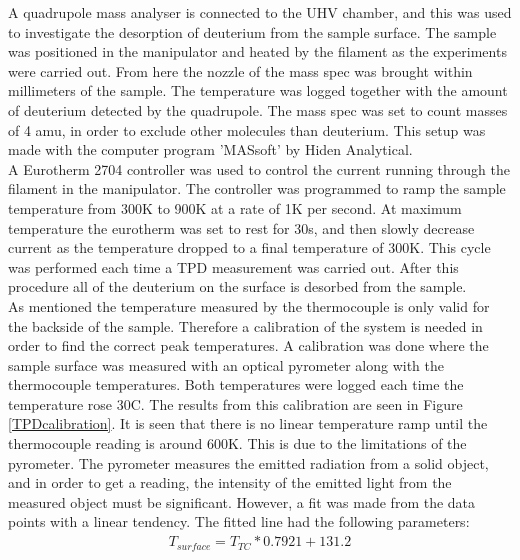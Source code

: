 A quadrupole mass analyser is connected to the UHV chamber, and this was used to investigate the desorption of deuterium from the sample surface. The sample was positioned in the manipulator and heated by the filament as the experiments were carried out. From here the nozzle of the mass spec was brought within millimeters of the sample. The temperature was logged together with the amount of deuterium detected by the quadrupole. The mass spec was set to count masses of 4 amu, in order to exclude other molecules than deuterium. This setup was made with the computer program 'MASsoft' by Hiden Analytical.\\
A Eurotherm 2704 controller was used to control the current running through the filament in the manipulator. The controller was programmed to ramp the sample temperature from 300K to 900K at a rate of 1K per second. At maximum temperature the eurotherm was set to rest for 30s, and then slowly decrease current as the temperature dropped to a final temperature of 300K. This cycle was performed each time a TPD measurement was carried out. After this procedure all of the deuterium on the surface is desorbed from the sample.\\
As mentioned the temperature measured by the thermocouple is only valid for the backside of the sample. Therefore a calibration of the system is needed in order to find the correct peak temperatures. A calibration was done where the sample surface was measured with an optical pyrometer along with the thermocouple temperatures. Both temperatures were logged each time the temperature rose 30\degree C. The results from this calibration are seen in Figure \ref{TPDcalibration}. It is seen that there is no linear temperature ramp until the thermocouple reading is around 600K. This is due to the limitations of the pyrometer. The pyrometer measures the emitted radiation from a solid object, and in order to get a reading, the intensity of the emitted light from the measured object must be significant.\cite{pyrometer} However, a fit was made from the data points with a linear tendency. The fitted line had the following parameters:
\begin{align*}
  T_{surface} = T_{TC} * 0.7921 + 131.2
\end{align*}

